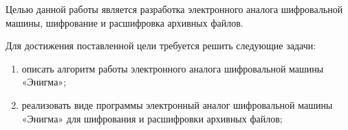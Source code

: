 %
%
%


Целью данной работы является разработка электронного аналога шифровальной машины, шифрование и расшифровка архивных файлов. 


Для достижения поставленной цели требуется решить следующие задачи:
\begin{enumerate}[label={\arabic*)}]
	\item описать алгоритм работы электронного аналога шифровальной машины «Энигма»;
	\item реализовать виде программы электронный аналог шифровальной машины «Энигма» для шифрования и расшифровки архивных файлов;
\end{enumerate}


\clearpage
